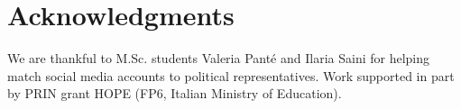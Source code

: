 \documentclass[letterpaper]{article} %
\begin{document}
\section{Acknowledgments}
We are thankful to M.Sc. students Valeria Panté and Ilaria Saini for helping match social media accounts to political representatives. Work supported in part by PRIN grant HOPE (FP6, Italian Ministry of Education).


\end{document}
